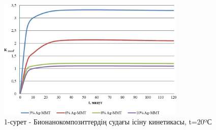 \begin{figure}[H]
	\centering
	\includegraphics[width=0.8\textwidth]{media/chem/image14}
	\caption*{1-сурет - Бионанокомпозиттердің судағы ісіну кинетикасы, t=20ºС}
\end{figure}

